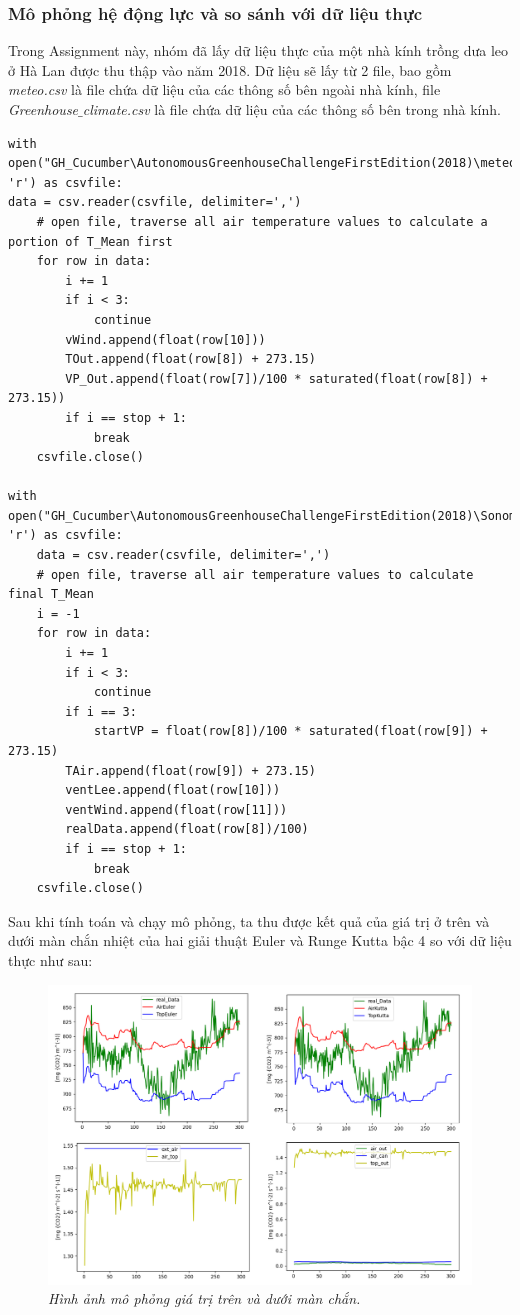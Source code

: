 \documentclass[13pt,a4paper]{article}
\begin{document}
			\subsubsection{Mô phỏng hệ động lực và so sánh với dữ liệu thực}
				Trong Assignment này, nhóm đã lấy dữ liệu thực của một nhà kính trồng dưa leo ở Hà Lan được thu thập vào năm 2018. Dữ liệu sẽ lấy từ 2 file, bao gồm \textit{meteo.csv} là file chứa dữ liệu của các thông số bên ngoài nhà kính, file \textit{Greenhouse$\_$climate.csv} là file chứa dữ liệu của các thông số bên trong nhà kính.
\begin{lstlisting}
with open("GH_Cucumber\AutonomousGreenhouseChallengeFirstEdition(2018)\meteo.csv", 'r') as csvfile:
data = csv.reader(csvfile, delimiter=',')
	# open file, traverse all air temperature values to calculate a portion of T_Mean first
	for row in data:
		i += 1
		if i < 3: 
			continue
		vWind.append(float(row[10]))
		TOut.append(float(row[8]) + 273.15)
		VP_Out.append(float(row[7])/100 * saturated(float(row[8]) + 273.15))
		if i == stop + 1: 
			break
	csvfile.close()

with open("GH_Cucumber\AutonomousGreenhouseChallengeFirstEdition(2018)\Sonoma\Greenhouse_climate.csv", 'r') as csvfile:
	data = csv.reader(csvfile, delimiter=',')
	# open file, traverse all air temperature values to calculate final T_Mean
	i = -1
	for row in data:
		i += 1
		if i < 3: 
			continue
		if i == 3: 
			startVP = float(row[8])/100 * saturated(float(row[9]) + 273.15)
		TAir.append(float(row[9]) + 273.15)
		ventLee.append(float(row[10]))
		ventWind.append(float(row[11]))
		realData.append(float(row[8])/100)
		if i == stop + 1:
			break
	csvfile.close()
\end{lstlisting}
		Sau khi tính toán và chạy mô phỏng, ta thu được kết quả của giá trị  ở trên và dưới màn chắn nhiệt của hai giải thuật Euler và Runge Kutta bậc 4 so với dữ liệu thực như sau:
		\begin{figure}[h!]
			\begin{center}
				\includegraphics[width=12cm]{sim_co2.png}
				\caption{\textit{Hình ảnh mô phỏng giá trị  trên và dưới màn chắn.}}
				\label{h17}
			\end{center}
		\end{figure} \\
\end{document}
